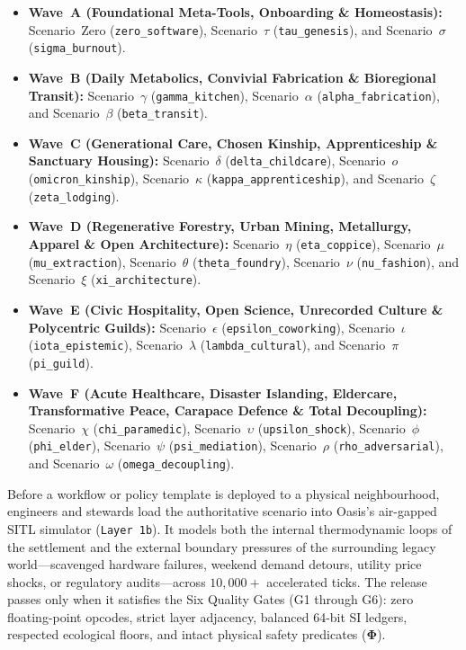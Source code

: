 \begin{itemize}
  \item \textbf{Wave~A (Foundational Meta-Tools, Onboarding \& Homeostasis):} Scenario~Zero (\texttt{zero\_software}), Scenario~$\tau$ (\texttt{tau\_genesis}), and Scenario~$\sigma$ (\texttt{sigma\_burnout}).
  \item \textbf{Wave~B (Daily Metabolics, Convivial Fabrication \& Bioregional Transit):} Scenario~$\gamma$ (\texttt{gamma\_kitchen}), Scenario~$\alpha$ (\texttt{alpha\_fabrication}), and Scenario~$\beta$ (\texttt{beta\_transit}).
  \item \textbf{Wave~C (Generational Care, Chosen Kinship, Apprenticeship \& Sanctuary Housing):} Scenario~$\delta$ (\texttt{delta\_childcare}), Scenario~$o$ (\texttt{omicron\_kinship}), Scenario~$\kappa$ (\texttt{kappa\_apprenticeship}), and Scenario~$\zeta$ (\texttt{zeta\_lodging}).
  \item \textbf{Wave~D (Regenerative Forestry, Urban Mining, Metallurgy, Apparel \& Open Architecture):} Scenario~$\eta$ (\texttt{eta\_coppice}), Scenario~$\mu$ (\texttt{mu\_extraction}), Scenario~$\theta$ (\texttt{theta\_foundry}), Scenario~$\nu$ (\texttt{nu\_fashion}), and Scenario~$\xi$ (\texttt{xi\_architecture}).
  \item \textbf{Wave~E (Civic Hospitality, Open Science, Unrecorded Culture \& Polycentric Guilds):} Scenario~$\epsilon$ (\texttt{epsilon\_coworking}), Scenario~$\iota$ (\texttt{iota\_epistemic}), Scenario~$\lambda$ (\texttt{lambda\_cultural}), and Scenario~$\pi$ (\texttt{pi\_guild}).
  \item \textbf{Wave~F (Acute Healthcare, Disaster Islanding, Eldercare, Transformative Peace, Carapace Defence \& Total Decoupling):} Scenario~$\chi$ (\texttt{chi\_paramedic}), Scenario~$\upsilon$ (\texttt{upsilon\_shock}), Scenario~$\phi$ (\texttt{phi\_elder}), Scenario~$\psi$ (\texttt{psi\_mediation}), Scenario~$\rho$ (\texttt{rho\_adversarial}), and Scenario~$\omega$ (\texttt{omega\_decoupling}).
\end{itemize}

Before a workflow or policy template is deployed to a physical neighbourhood, engineers and stewards load the authoritative scenario into Oasis's air-gapped SITL simulator (\texttt{Layer 1b}). It models both the internal thermodynamic loops of the settlement and the external boundary pressures of the surrounding legacy world---scavenged hardware failures, weekend demand detours, utility price shocks, or regulatory audits---across $10{,}000+$ accelerated ticks. The release passes only when it satisfies the Six Quality Gates (G1 through G6): zero floating-point opcodes, strict layer adjacency, balanced 64-bit SI ledgers, respected ecological floors, and intact physical safety predicates ($\mathbf{\Phi}$).

